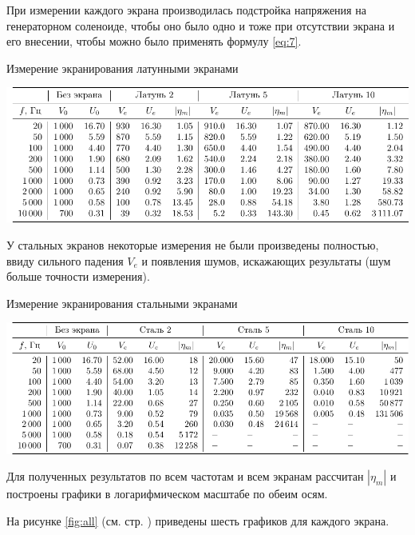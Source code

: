 \documentclass[a4paper,12pt]{article}
\begin{document}
При измерении каждого экрана производилась подстройка напряжения на генераторном соленоиде, чтобы оно было одно и тоже при отсутствии экрана и его внесении, чтобы можно было применять формулу \eqref{eq:7}.

\begin{table}[h!]
	\caption{Измерение экранирования латунными экранами}
	\label{tab:6s1}
	\vspace{1em}
	\centering
	\includegraphics[width=\textwidth]{tables/table1}
\end{table}

У стальных экранов некоторые измерения не были произведены полностью, ввиду сильного падения $V_e$ и появления шумов, искажающих результаты (шум больше точности измерения).

\begin{table}[h!]
	\caption{Измерение экранирования стальными экранами}
	\label{tab:6s1}
	\vspace{1em}
	\centering
	\includegraphics[width=\textwidth]{tables/table2}
\end{table}

Для полученных результатов по всем частотам и всем экранам рассчитан $|\eta_m|$ и построены графики в логарифмическом масштабе по обеим осям.

На рисунке \ref{fig:all} (см. стр. \pageref{fig:all}) приведены шесть графиков для каждого экрана. 
\end{document}
